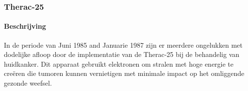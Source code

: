 \documentclass{article}
\begin{document}
	
	\subsubsection{Therac-25}
	\paragraph{Beschrijving}
				 In de periode van Juni 1985 and Januarie 1987 zijn er meerdere ongelukken met dodelijke afloop door de implementatie van de Therac-25 bij de behandelig van huidkanker.
				Dit apparaat gebruikt elektronen om stralen met hoge energie te creëren die tumoren kunnen vernietigen met minimale impact op het omliggende gezonde weefsel.
			
\end{document}
